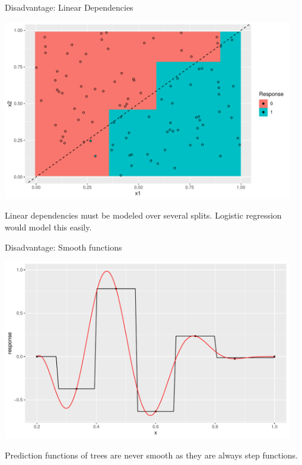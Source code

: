 \documentclass[11pt,compress,t,notes=noshow, xcolor=table]{beamer}
\newenvironment{knitrout}{}{} %
\begin{document}
\begin{vbframe}{Disadvantage: Linear Dependencies}
\begin{knitrout}\scriptsize
{}\color{fgcolor}

{\centering \includegraphics[width=0.95\textwidth]{figure/cart_dis_1}

}



\end{knitrout}
Linear dependencies must be modeled over several splits. Logistic regression would model this easily.
\end{vbframe}

\begin{vbframe}{Disadvantage: Smooth functions}
\begin{knitrout}\scriptsize
{}\color{fgcolor}

{\centering \includegraphics[width=0.95\textwidth]{figure/cart_dis_2}

}



\end{knitrout}
Prediction functions of trees are never smooth as they are always step functions.
\end{vbframe}
\end{document}
